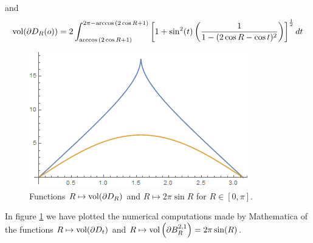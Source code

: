\documentclass{amsart}
\theoremstyle{definition}
\theoremstyle{remark}
\begin{document}
and
$$
{\rm vol}(\partial D_R(o))=2\int_{\arccos{\left(2\cos{R}+1\right)}}^{2\pi-\arccos{\left(2\cos{R}+1\right)}}\left[1+\sin^2(t)\left(\frac{1}{1-(2\cos{R}-\cos{t})^2}\right)\right]^{\frac{1}{2}}dt
$$
\begin{figure}
    \centering
    \includegraphics[scale=0.3]{perimeter.png} \caption{\small Functions $R\mapsto{\rm vol}(\partial D_R)$ and $R\mapsto2\pi \sin{R}$ for $R\in [0,\pi]$. }\label{fig:perimeter}
\end{figure}
In figure \ref{fig:perimeter} we have plotted the numerical computations made by Mathematica of the functions $R\mapsto {\rm vol}(\partial D_t)$ and $R\mapsto {\rm vol}\left(\partial B^{2,1}_R\right)=2\pi\sin(R)$.
\end{document}
